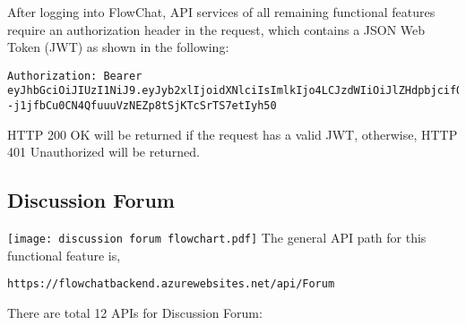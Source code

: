 \documentclass[11pt, a4paper]{article}
\begin{document}
\bigskip

After logging into FlowChat, API services of all remaining functional features require an authorization header in the request, which contains a JSON Web Token (JWT) as shown in the following: 

\begin{lstlisting}[breaklines=true, frame=single]
Authorization: Bearer eyJhbGciOiJIUzI1NiJ9.eyJyb2xlIjoidXNlciIsImlkIjo4LCJzdWIiOiJlZHdpbjcifQ.--j1jfbCu0CN4QfuuuVzNEZp8tSjKTcSrTS7etIyh50
\end{lstlisting}

HTTP 200 OK will be returned if the request has a valid JWT, otherwise, HTTP 401 Unauthorized will be returned.

\subsection{Discussion Forum}
\texttt{[image: discussion forum flowchart.pdf]}
The general API path for this functional feature is,

\begin{center}
    \texttt{https://flowchatbackend.azurewebsites.net/api/Forum}
\end{center}

There are total 12 APIs for Discussion Forum:
\end{document}

